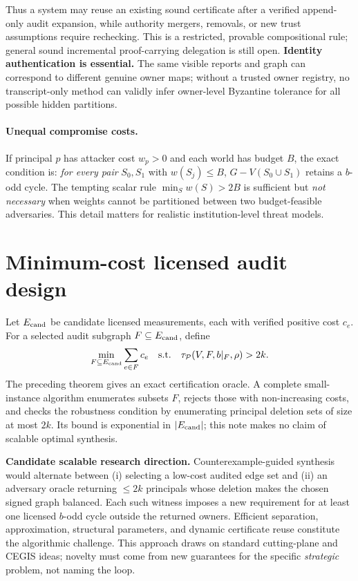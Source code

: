 \documentclass[10pt,a4paper]{article}
\theoremstyle{definition}\newtheorem{definition}[theorem]{Definition}
\newcommand{\Princ}{\mathcal P}
\begin{document}
Thus a system may reuse an existing sound certificate after a verified append-only audit expansion, while authority mergers, removals, or new trust assumptions require rechecking. This is a restricted, provable compositional rule; general sound incremental proof-carrying delegation is still open. \textbf{Identity authentication is essential.} The same visible reports and graph can correspond to different genuine owner maps; without a trusted owner registry, no transcript-only method can validly infer owner-level Byzantine tolerance for all possible hidden partitions.

\paragraph{Unequal compromise costs.} If principal $p$ has attacker cost $w_p>0$ and each world has budget $B$, the exact condition is: \emph{for every pair} $S_0,S_1$ with $w(S_j)\le B$, $G-V(S_0\cup S_1)$ retains a $b$-odd cycle. The tempting scalar rule $\min_S w(S)>2B$ is sufficient but \emph{not necessary} when weights cannot be partitioned between two budget-feasible adversaries. This detail matters for realistic institution-level threat models.

\section{Minimum-cost licensed audit design}
Let $E_{\rm cand}$ be candidate licensed measurements, each with verified positive cost $c_e$. For a selected audit subgraph $F\subseteq E_{\rm cand}$, define
\begin{equation}\label{eq:design}
 \min_{F\subseteq E_{\rm cand}}\sum_{e\in F}c_e\quad\text{s.t.}\quad\tau_{\Princ}(V,F,b|_F,\rho)>2k.
\end{equation}
The preceding theorem gives an exact certification oracle. A complete small-instance algorithm enumerates subsets $F$, rejects those with non-increasing costs, and checks the robustness condition by enumerating principal deletion sets of size at most $2k$. Its bound is exponential in $|E_{\rm cand}|$; this note makes no claim of scalable optimal synthesis.

\textbf{Candidate scalable research direction.} Counterexample-guided synthesis would alternate between (i) selecting a low-cost audited edge set and (ii) an adversary oracle returning $\le2k$ principals whose deletion makes the chosen signed graph balanced. Each such witness imposes a new requirement for at least one licensed $b$-odd cycle outside the returned owners. Efficient separation, approximation, structural parameters, and dynamic certificate reuse constitute the algorithmic challenge. This approach draws on standard cutting-plane and CEGIS ideas; novelty must come from new guarantees for the specific \emph{strategic} problem, not naming the loop.
\end{document}
